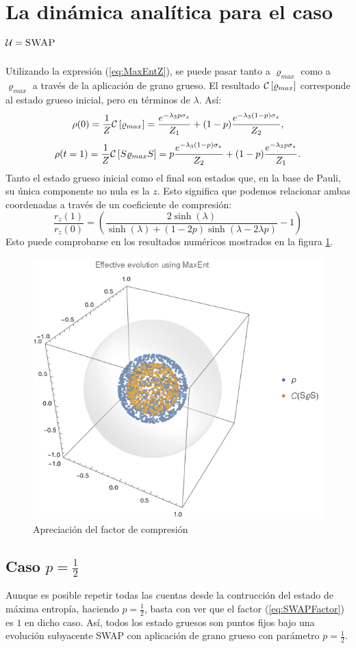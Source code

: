 \section{La dinámica analítica para el caso $\mathcal{U}=\textsc{SWAP}$}

Utilizando la expresión (\ref{eq:MaxEntZ}), se puede pasar tanto a $\varrho_{max}$ como a $\varrho_{max}$ a través de la aplicación de grano grueso. El resultado $\mathcal{C}\left[\varrho_{max}\right]$ corresponde al estado grueso inicial, pero en términos de $\lambda$. Así:
\begin{equation}
\rho(0)=\frac{1}{Z}\mathcal{C}\left[\varrho_{max}\right]=\frac{e^{-\lambda_{3}p\sigma_{z}}}{Z_{1}}+(1-p)\frac{e^{-\lambda_{3}(1-p)\sigma_{z}}}{Z_{2}},
\end{equation}
\begin{equation}
\rho(t=1)=\frac{1}{Z}\mathcal{C}\left[S\varrho_{max} S\right]=p\frac{e^{-\lambda_{3}(1-p)\sigma_{z}}}{Z_{2}}+(1-p)\frac{e^{-\lambda_{3}p\sigma_{z}}}{Z_{1}}.
\end{equation}
Tanto el estado grueso inicial como el final son estados que, en la base de Pauli, su única componente no nula es la $z$. Esto significa que podemos relacionar ambas coordenadas a través de un coeficiente de compresión:
\begin{equation}\label{eq:SWAPFactor}
            \frac{r_{z}(1)}{r_{z}(0)}=\left(\frac{2 \sinh (\lambda )}{\sinh (\lambda )+(1-2 p) \sinh (\lambda -2 \lambda  p)}-1\right)
\end{equation}
Esto puede comprobarse en los resultados numéricos mostrados en la figura \ref{fig:factornnum}.
\begin{figure}[h!]
\centering
\includegraphics[width=0.6\linewidth]{maxent/figures/MaxEnt_SWAP_t0vst1_n=5000_z=0.5_p=0.3_beta=150_delta=0.6.png}
\caption{Apreciación del factor de compresión }
\label{fig:factornnum}
\end{figure}

\subsection{Caso $p=\frac{1}{2}$}

Aunque es posible repetir todas las cuentas desde la contrucción del estado de máxima entropía, haciendo $p=\frac{1}{2}$, basta con ver que el factor (\eqref{eq:SWAPFactor}) es $1$ en dicho caso. Así, todos los estado gruesos son puntos fijos bajo una evolución subyacente SWAP con aplicación de grano grueso con parámetro $p=\frac{1}{2}$.
